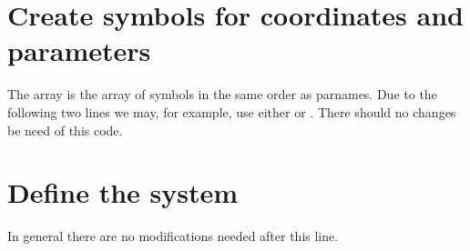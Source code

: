 \documentclass[letterpaper,10pt,english]{jupyterBook}
\begin{document}
\section{Create symbols for coordinates and parameters}
\label{\detokenize{BogdanovTakensNormalFormGenSym:create-symbols-for-coordinates-and-parameters}}
\sphinxAtStartPar
The array  is the array of symbols in the same order as parnames.
Due to the following two lines we may, for example, use either  or
. There should no changes be need of this code.

\begin{sphinxVerbatim}[commandchars=\\\{\}]
\end{sphinxVerbatim}


\section{Define the system}
\label{\detokenize{BogdanovTakensNormalFormGenSym:define-the-system}}
\begin{sphinxVerbatim}[commandchars=\\\{\}]
\PYGZca{}
\PYG{p}{[}\PYG{p}{]}
\end{sphinxVerbatim}

\sphinxAtStartPar
In general there are no modifications needed after this line.
\end{document}
